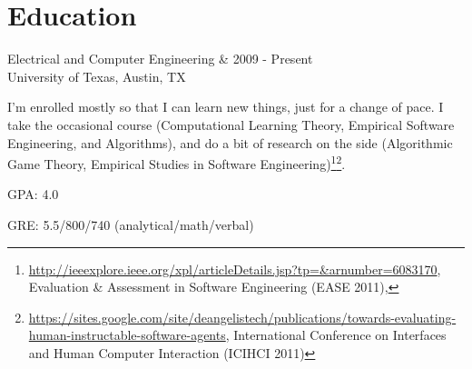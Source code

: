 \documentclass[letterpaper]{scrartcl}
\begin{document}
\section*{Education}
\begin{list1}
	\item
	\begin{tabular1bold}Electrical and Computer Engineering & 2009 - Present \\
	University of Texas, Austin, TX
	\end{tabular1bold}

\begin{adjustwidth}{1.5em}{1.5em}
  I'm enrolled mostly so that I can learn new things, just for a change of pace. I take the occasional course (Computational Learning Theory, Empirical Software Engineering, and Algorithms), and do a bit of research on the side (Algorithmic Game Theory, Empirical Studies in Software Engineering)\footnote{\href{Designing human benchmark experiments for testing software agents}{http://ieeexplore.ieee.org/xpl/articleDetails.jsp?tp=\&arnumber=6083170}, Evaluation \& Assessment in Software Engineering (EASE 2011), }\footnote{\href{Towards Evaluating Human-Instructable Software Agents}{https://sites.google.com/site/deangelistech/publications/towards-evaluating-human-instructable-software-agents}, International Conference on Interfaces and Human Computer Interaction (ICIHCI 2011)}.
\end{adjustwidth}
	\begin{list2}
	\item GPA: 4.0
	\item GRE: 5.5/800/740 (analytical/math/verbal)
	\end{list2}


\end{list1}
\end{document}
